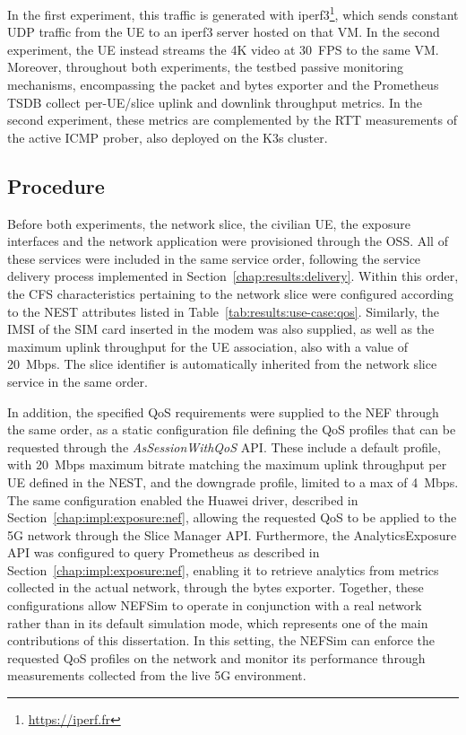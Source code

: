 In the first experiment, this traffic is generated with iperf3\footnote{\url{https://iperf.fr}}, which sends constant \acs{UDP} traffic from the \acs{UE} to an iperf3 server hosted on that \acs{VM}. In the second experiment, the \acs{UE} instead streams the 4K video at 30~\acs{FPS} to the same \acs{VM}. Moreover, throughout both experiments, the testbed passive monitoring mechanisms, encompassing the packet and bytes exporter and the Prometheus \acs{TSDB} collect per-\acs{UE}/slice uplink and downlink throughput metrics. In the second experiment, these metrics are complemented by the \acs{RTT} measurements of the active \acs{ICMP} prober, also deployed on the K3s cluster.

\subsection{Procedure}
\label{chap:results:use-case:procedure}

Before both experiments, the network slice, the civilian \acs{UE}, the exposure interfaces and the network application were provisioned through the \acs{OSS}. All of these services were included in the same service order, following the service delivery process implemented in Section~\ref{chap:results:delivery}. Within this order, the \acs{CFS} characteristics pertaining to the network slice were configured according to the \acs{NEST} attributes listed in Table~\ref{tab:results:use-case:qos}. Similarly, the \acs{IMSI} of the SIM card inserted in the modem was also supplied, as well as the maximum uplink throughput for the \acs{UE} association, also with a value of 20~Mbps. The slice identifier is automatically inherited from the network slice service in the same order.

In addition, the specified \acs{QoS} requirements were supplied to the \acs{NEF} through the same order, as a static configuration file defining the \acs{QoS} profiles that can be requested through the \textit{AsSessionWithQoS} \acs{API}. These include a default profile, with 20~Mbps maximum bitrate matching the maximum uplink throughput per \acs{UE} defined in the \acs{NEST}, and the downgrade profile, limited to a max of 4~Mbps. The same configuration enabled the Huawei driver, described in Section~\ref{chap:impl:exposure:nef}, allowing the requested \acs{QoS} to be applied to the \acs{5G} network through the Slice Manager \acs{API}. Furthermore, the AnalyticsExposure \acs{API} was configured to query Prometheus as described in Section~\ref{chap:impl:exposure:nef}, enabling it to retrieve analytics from metrics collected in the actual network, through the bytes exporter. Together, these configurations allow \acs{NEF}Sim to operate in conjunction with a real network rather than in its default simulation mode, which represents one of the main contributions of this dissertation. In this setting, the \acs{NEF}Sim can enforce the requested \acs{QoS} profiles on the network and monitor its performance through measurements collected from the live \acs{5G} environment.

